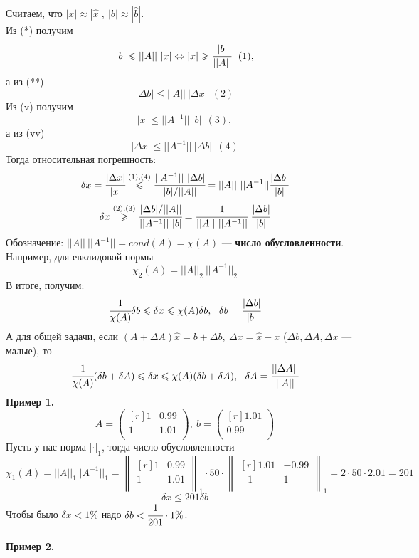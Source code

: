 \documentclass[12pt]{article}
\theoremstyle{definition}
\numberwithin{equation}{section}
\begin{document}
	Считаем, что $|x|\approx |\hat x|,~ |b|\approx |\hat b|$.\\
	Из (*) получим $$|b|\leqslant ||A||~|x| \Leftrightarrow |x| \geqslant \cfrac{|b|}{||A||}~~(1),$$а из (**) $$|\Delta b|\leqslant ||A||~|\Delta x|~~(2)$$
	Из (v) получим $$|x|\leqslant ||A^{-1}||~|b|~~(3),$$ а из (vv) $$|\Delta x|\leqslant ||A^{-1}||~|\Delta b|~~(4)$$
	Тогда относительная погрешность: $$\delta x=\cfrac{|\Delta x|}{|x|}\overset{(1), (4)}{\leqslant} \cfrac{||A^{-1}||~|\Delta b|}{|b|/||A||} = ||A||~||A^{-1}||\cfrac{|\Delta b|}{|b|}$$
	$$\delta x \overset{(2), (3)}{\geqslant} \cfrac{|\Delta b|/||A||}{||A^{-1}||~|b|}=\cfrac{1}{||A||~||A^{-1}||}~\cfrac{|\Delta b|}{|b|}$$
	Обозначение: $||A||~||A^{-1}|| = cond(A) = \chi (A) $ --- \textbf{число обусловленности}.\\
	Например, для евклидовой нормы $$\chi_2(A)=||A||_2~||A^{-1}||_2$$
	В итоге, получим: $$\cfrac{1}{\chi(A)}\delta b \leqslant \delta x\leqslant \chi(A) \delta b,~~\delta b=\cfrac{|\Delta b|}{|b|}$$
	А для общей задачи, если $(A+\Delta A) \hat x =b+\Delta b,~ \Delta x=\hat x-x$ ($\Delta b, \Delta A, \Delta x$ --- малые), то
	$$\cfrac{1}{\chi(A)}(\delta b+\delta A) \leqslant \delta x \leqslant \chi(A)(\delta b+\delta A),~~\delta A=\cfrac{||\Delta A||}{||A||}$$
	\textbf{Пример 1.}\\
	\[A=\begin{pmatrix}[r]
	1 & 0.99 \\
	1 & 1.01 \\
	\end{pmatrix},~ \bar b=\begin{pmatrix}[r]
	1.01 \\
	0.99 \\
	\end{pmatrix}\]
	Пусть у нас норма $|\cdot|_1$, тогда число обусловленности 
	\[\chi_1(A)=||A||_1||A^{-1}||_1=\begin{Vmatrix}[r]
	1 & 0.99 \\
	1 & 1.01 \\
	\end{Vmatrix}_1 \cdot 50 \cdot \begin{Vmatrix}[r]
	1.01 & -0.99 \\
	-1 & 1 \\
	\end{Vmatrix}_1 = 2\cdot 50 \cdot 2.01 = 201\]
	$$\delta x \leqslant 201 \delta b$$
	Чтобы было $\delta x <1\%$ надо $\delta b<\cfrac{1}{201}\cdot 1\%$.\\
	\\
	\textbf{Пример 2.}\\
\end{document}
